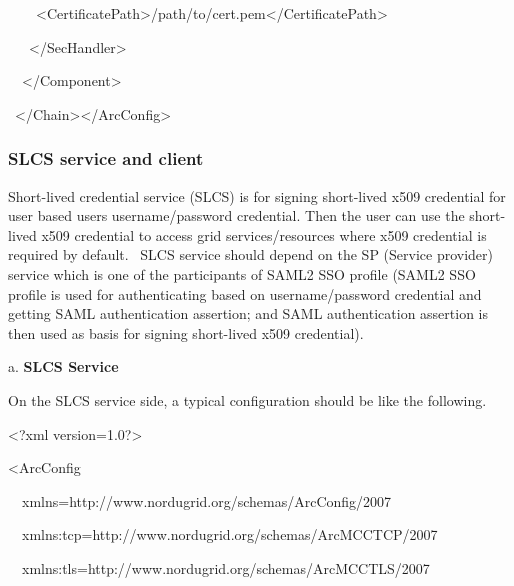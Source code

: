\documentclass{article}
\begin{document}
{\ttfamily\color{black}
\ \ \ \ {\textless}CertificatePath{\textgreater}/path/to/cert.pem{\textless}/CertificatePath{\textgreater}}

{\ttfamily\color{black}
\ \ \ {\textless}/SecHandler{\textgreater}}

{\ttfamily\color{black}
\ \ {\textless}/Component{\textgreater}}

{\ttfamily\color{black}
\ {\textless}/Chain{\textgreater}{\textless}/ArcConfig{\textgreater}}

\subsubsection[SLCS service and client]{SLCS service and client}
{\color{black}
Short-lived credential service (SLCS) is for signing short-lived x509
credential for user based user{\textquotesingle}s username/password
credential. Then the user can use the short-lived x509 credential to
access grid services/resources where x509 credential is required by
default. \ SLCS service should depend on the SP (Service provider)
service which is one of the participants of SAML2 SSO profile (SAML2
SSO profile is used for authenticating based on username/password
credential and getting SAML authentication assertion; and SAML
authentication assertion is then used as basis for signing short-lived
x509 credential).}

{\color{black}
a. \textbf{SLCS Service} }

{\color{black}
On the SLCS service side, a typical configuration should be like the
following.}

{\ttfamily\color{black}
{\textless}?xml
version={\textquotedbl}1.0{\textquotedbl}?{\textgreater}}

{\ttfamily\color{black}
{\textless}ArcConfig}

{\ttfamily\color{black}
\ \ xmlns={\textquotedbl}http://www.nordugrid.org/schemas/ArcConfig/2007{\textquotedbl}}

{\ttfamily\color{black}
\ \ xmlns:tcp={\textquotedbl}http://www.nordugrid.org/schemas/ArcMCCTCP/2007{\textquotedbl}}

{\ttfamily\color{black}
\ \ xmlns:tls={\textquotedbl}http://www.nordugrid.org/schemas/ArcMCCTLS/2007{\textquotedbl}}
\end{document}
